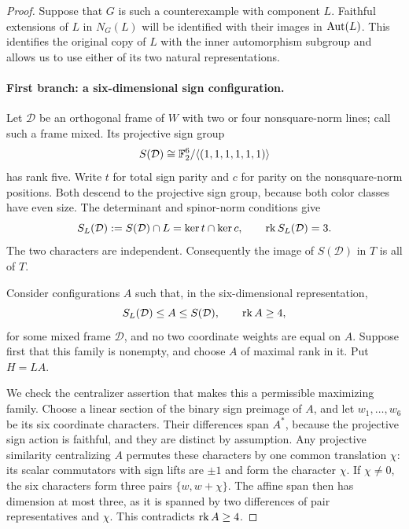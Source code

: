 \begin{proof}
Suppose that $G$ is such a counterexample with component $L$.
Faithful extensions of $L$ in $N_G(L)$ will be identified with
their images in $\operatorname{Aut}(L)$. This identifies the original copy of
$L$ with the inner automorphism subgroup and allows us to use
either of its two natural representations.

\paragraph{First branch: a six-dimensional sign configuration.}
Let $\mathcal D$ be an orthogonal frame of $W$ with two or four
nonsquare-norm lines; call such a frame mixed. Its projective sign
group
\[
 S(\mathcal D)\cong\mathbb F_2^6/\langle(1,1,1,1,1,1)\rangle
\]
has rank five. Write $t$ for total sign parity and $c$ for parity
on the nonsquare-norm positions. Both descend to the projective
sign group, because both color classes have even size.
The determinant and spinor-norm conditions give
\begin{equation}\label{eq:psl45-inner-signs}
 S_L(\mathcal D):=S(\mathcal D)\cap L=\ker t\cap\ker c,
 \qquad \operatorname{rk} S_L(\mathcal D)=3.
\end{equation}
The two characters are independent. Consequently the image of
$S(\mathcal D)$ in $T$ is all of $T$.

Consider configurations $A$ such that, in the six-dimensional
representation,
\[
 S_L(\mathcal D)\leq A\leq S(\mathcal D),\qquad
 \operatorname{rk} A\geq4,
\]
for some mixed frame $\mathcal D$, and no two coordinate weights
are equal on $A$. Suppose first that this family is nonempty,
and choose $A$ of maximal rank in it. Put $H=LA$.

We check the centralizer assertion that makes this a permissible
maximizing family. Choose a linear section of the binary sign
preimage of $A$, and let $w_1,\ldots,w_6$ be its six coordinate
characters. Their differences span $A^*$, because the projective
sign action is faithful, and they are distinct by assumption.
Any projective similarity centralizing $A$ permutes these
characters by one common translation $\chi$: its scalar
commutators with sign lifts are $\pm1$ and form the character
$\chi$. If $\chi\ne0$, the six characters form three pairs
$\{w,w+\chi\}$. The affine span then has dimension at most three,
as it is spanned by two differences of pair representatives and
$\chi$. This contradicts $\operatorname{rk} A\geq4$.


\end{proof}
